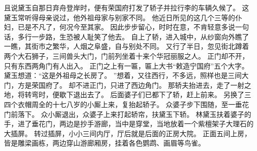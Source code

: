 且说黛玉自那日弃舟登岸时，便有荣国府打发了轿子并拉行李的车辆久候了。
这黛玉常听得母亲说过，他外祖母家与别家不同。
他近日所见的这几个三等的仆妇，已是不凡了，何况今至其家。
因此步步留心，时时在意，不肯轻意多说一句话，多行一步路，生恐被人耻笑了他去。
自上了轿，进入城中，从纱窗向外瞧了一瞧，其街市之繁华，人烟之阜盛，自与别处不同。
又行了半日，忽见街北蹲着两个大石狮子，三间兽头大门，门前列坐着十来个华冠丽服之人。
正门却不开，只有东西两角门有人出入。
正门之上有一匾，匾上大书“敕造宁国府”五个大字。
黛玉想道：“这是外祖母之长房了。
”想着，又往西行，不多远，照样也是三间大门，方是荣国府了。
却不进正门，只进了西边角门。
那轿夫抬进去，走了一射之地，将转弯时，便歇下退出去了。
后面婆子们已都下了轿，赶上前来。
另换了三四个衣帽周全的十七八岁的小厮上来，复抬起轿子。
众婆子步下围随，至一垂花门前落下。
众小厮退出，众婆子上来打起轿帘，扶黛玉下轿。
林黛玉扶着婆子的手，进了垂花门，两边是抄手游廊，当中是穿堂，当地放着一个紫檀架子大理石的大插屏。
转过插屏，小小三间内厅，厅后就是后面的正房大院。
正面五间上房，皆是雕梁画栋，两边穿山游廊厢房，挂着各色鹦鹉、画眉等鸟雀。
